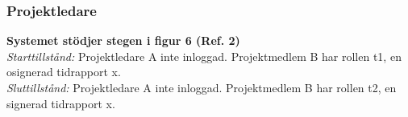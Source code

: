 \documentclass[a4paper]{article}
\begin{document}
\subsubsection{Projektledare}

\begin{ST}
\item 
\textbf{Systemet stödjer stegen i figur 6 (Ref. 2)}\\
\emph{Starttillstånd:} Projektledare A inte inloggad. Projektmedlem B har rollen t1, en osignerad tidrapport x.\\
\emph{Sluttillstånd:} Projektledare A inte inloggad. Projektmedlem B har rollen t2, en signerad tidrapport x.\\

\begin{enumerate}


\end{enumerate}
\end{ST}
\end{document}

